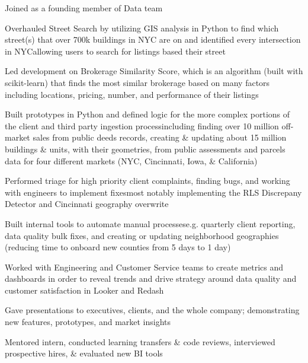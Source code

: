 \documentclass[a4paper]{deedy-resume-openfont} %
\begin{document}
\begin{minipage}[t]{0.66\textwidth}
\begin{tightitemize}
	\item Joined as a founding member of Data team
    \item Overhauled Street Search by utilizing GIS analysis in Python to find which street(s) that over 700k buildings in NYC are on and identified every intersection in NYC\textemdash allowing users to search for listings based their street
    \item Led development on Brokerage Similarity Score, which is an algorithm (built with scikit-learn) that finds the most similar brokerage based on many factors including locations, pricing, number, and performance of their listings
    \item Built prototypes in Python and defined logic for the more complex portions of the client and third party ingestion process\textemdash including finding over 10 million off-market sales from public deeds records, creating \& updating about 15 million buildings \& units, with their geometries, from public assessments and parcels data for four different markets (NYC, Cincinnati, Iowa, \& California)
    \item Performed triage for high priority client complaints, finding bugs, and working with engineers to implement fixes\textemdash most notably implementing the RLS Discrepany Detector and Cincinnati geography overwrite
    \item Built internal tools to automate manual processes\textemdash e.g. quarterly client reporting, data quality bulk fixes, and creating or updating neighborhood geographies (reducing time to onboard new counties from 5 days to 1 day)
    \item Worked with Engineering and Customer Service teams to create metrics and dashboards in order to reveal trends and drive strategy around data quality and customer satisfaction in Looker and Redash
    \item Gave presentations to executives, clients, and the whole company; demonstrating new features, prototypes, and market insights
    \item Mentored intern, conducted learning transfers \& code reviews, interviewed prospective hires, \& evaluated new BI tools
\end{tightitemize}


\end{minipage}
\end{document}
